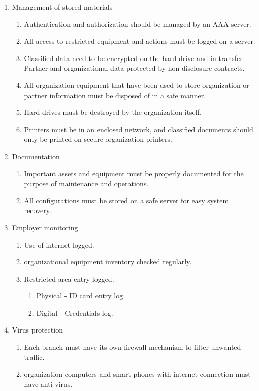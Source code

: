 \begin{enumerate}
  \item Management of stored materials
  \begin{enumerate}
    \item Authentication and authorization should be managed by an AAA server.
    \item All access to restricted equipment and actions must be logged on a server.
    \item Classified data need to be encrypted on the hard drive and in transfer - Partner and organizational data protected by non-disclosure contracts.
    \item All organization equipment that have been used to store organization or partner information must be disposed of in a safe manner.
    \item Hard drives must be destroyed by the organization itself.
    \item Printers must be in an enclosed network, and classified documents should only be printed on secure organization printers.
  \end{enumerate}
  \item Documentation
  \begin{enumerate}
      \item Important assets and equipment must be properly documented for the purpose of maintenance and operations.
      \item All configurations must be stored on a safe server for easy system recovery.
  \end{enumerate}
  \item Employer monitoring
  \begin{enumerate}
    \item Use of internet logged.
    \item organizational equipment inventory checked regularly.
    \item Restricted area entry logged.
    \begin{enumerate}
      \item Physical - ID card entry log.
      \item Digital - Credentials log.
    \end{enumerate}
  \end{enumerate}
  \item Virus protection
  \begin{enumerate}
    \item Each branch must have its own firewall mechanism to filter unwanted traffic.
    \item organization computers and smart-phones with internet connection must have anti-virus.

\end{enumerate}
\end{enumerate}
